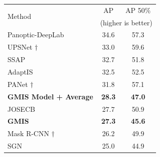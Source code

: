 \begin{figure}[t]
\begin{minipage}[t]{0.3\textwidth}
\end{minipage}\hfill
\begin{minipage}[t]{0.35\textwidth}
\centering
    \scriptsize
    \vspace*{-1.5em}
\begin{tabular}[t]{l|cc}
        \multirow{2}{*}{Method}    & AP  & AP 50\% \\ 
         & \multicolumn{2}{c}{(higher is better)} \\ \midrule
           Panoptic-DeepLab \cite{cheng2019panopticdeeplab} & 34.6 & 57.3 \\
           UPSNet \cite{xiong2019upsnet} $\dagger$ & 33.0 & 59.6 \\
           SSAP \cite{Gao_2019_ICCV} & 32.7 & 51.8 \\
           AdaptIS \cite{sofiiuk2019adaptis} & 32.5 & 52.5 \\
           PANet \cite{liu2018path} $\dagger$ & 31.8 & 57.1 \\
           \textbf{GMIS Model \cite{liu2018affinity} + \algname{} Average} & \textbf{28.3} & \textbf{47.0} \\ 
           JOSECB \cite{neven2019instance} & 27.7 & 50.9 \\
           \textbf{GMIS} \cite{liu2018affinity} & \textbf{27.3} & \textbf{45.6} \\
           Mask R-CNN \cite{he2017mask} $\dagger$ & 26.2 & 49.9 \\
           SGN \cite{liu2017sgn} & 25.0 & 44.9 \\
        \end{tabular}
    \label{tab:results_cityscapes}
    \label{tab:results_cityscapes_test}
\end{minipage}
\end{figure}

